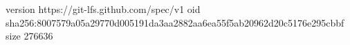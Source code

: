 version https://git-lfs.github.com/spec/v1
oid sha256:8007579a05a29770d005191da3aa2882aa6ea55f5ab20962d20c5176e295cbbf
size 276636
